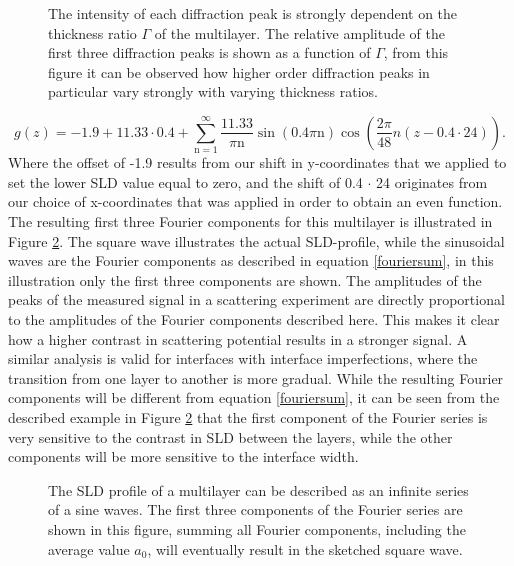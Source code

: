 \begin{figure}
	\centering
	\def\svgwidth{\textwidth}
	
	\caption{The intensity of each diffraction peak is strongly dependent on the thickness ratio $\Gamma$ of the multilayer. The relative amplitude of the first three diffraction peaks is shown as a function of $\Gamma$, from this figure it can be observed how higher order diffraction peaks in particular vary strongly with varying thickness ratios.}
	\label{gamma_intensity}
\end{figure}
\begin{equation}\label{fouriersum}
	g(z) = -1.9 + 11.33\cdot0.4 + \sum_{\textrm{n}=1}^{ \infty }  	\frac{11.33}{\pi \textrm{n}} \sin(0.4 \pi \textrm{n}) \cos(\frac{2\pi}{48}n(z - 0.4 \cdot 24)).
\end{equation}
Where the offset of -1.9 results from our shift in y-coordinates that we applied to set the lower SLD value equal to zero, and the shift of 0.4 $\cdot$ 24 originates from our choice of x-coordinates that was applied in order to obtain an even function. The resulting first three Fourier components for this multilayer is illustrated in Figure \ref{fourier}. The square wave illustrates the actual SLD-profile, while the sinusoidal waves are the Fourier components as described in equation \ref{fouriersum}, in this illustration only the first three components are shown. The amplitudes of the peaks of the measured signal in a scattering experiment are directly proportional to the amplitudes of the Fourier components described here. This makes it clear how a higher contrast in scattering potential results in a stronger signal. A similar analysis is valid for interfaces with interface imperfections, where the transition from one layer to another is more gradual. While the resulting Fourier components will be different from equation \ref{fouriersum}, it can be seen from the described example in Figure \ref{fourier} that the first component of the Fourier series is very sensitive to the contrast in SLD between the layers, while the other components will be more sensitive to the interface width. 
\begin{figure}
	\centering
	\def\svgwidth{\textwidth}
	
	\caption{The SLD profile of a multilayer can be described as an infinite series of a sine waves. The first three components of the Fourier series are shown in this figure, summing all Fourier components, including the average value $a_0$, will eventually result in the sketched square wave.}
	\label{fourier}
\end{figure}